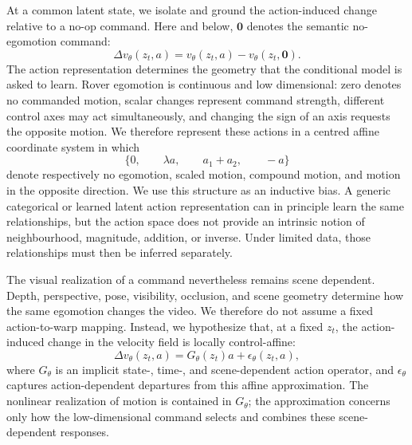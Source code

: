 \documentclass[letterpaper]{article} %
\begin{document}
At a common latent state, we isolate and ground the action-induced change
relative to a no-op command. Here and below, $\mathbf{0}$ denotes the semantic
no-egomotion command:
\begin{equation}
    \Delta v_\theta(z_t,a)
    =
    v_\theta(z_t,a)
    -
    v_\theta(z_t,\mathbf{0}).
    \label{eq:action_flow_difference}
\end{equation}
The action representation determines the geometry that the conditional model
is asked to learn. Rover egomotion is continuous and low dimensional: zero
denotes no commanded motion, scalar changes represent command strength,
different control axes may act simultaneously, and changing the sign of an
axis requests the opposite motion. We therefore represent these actions in a
centred affine coordinate system in which
\[
\{0,\qquad
\lambda a,\qquad
a_1+a_2,\qquad
-a\}
\]
denote respectively no egomotion, scaled motion, compound motion, and motion
in the opposite direction. We use this structure as an inductive bias. A generic
categorical or learned latent action representation can in principle learn
the same relationships, but the action space does not provide an intrinsic notion of neighbourhood, magnitude, addition, or inverse. Under limited data, those relationships must then be inferred separately. 

The visual realization of a command nevertheless remains scene dependent.
Depth, perspective, pose, visibility, occlusion, and scene geometry determine
how the same egomotion changes the video. We therefore do not assume a fixed
action-to-warp mapping. Instead, we hypothesize that, at a fixed $z_t$, the
action-induced change in the velocity field is locally control-affine:
\begin{equation}
    \Delta v_\theta(z_t,a)
    =
    G_\theta(z_t)a
    +
    \epsilon_\theta(z_t,a),
    \label{eq:implicit_control_affine}
\end{equation}
where $G_\theta$ is an implicit state-, time-, and scene-dependent action
operator, and $\epsilon_\theta$ captures action-dependent departures from
this affine approximation. The nonlinear realization of motion is contained
in $G_\theta$; the approximation concerns only how the low-dimensional
command selects and combines these scene-dependent responses.
\end{document}
